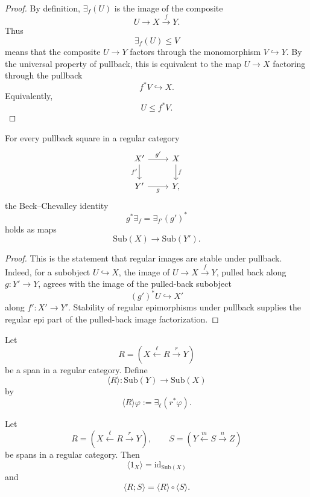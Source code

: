 \begin{proof}
By definition, \(\exists_f(U)\) is the image of the composite
\[
U\to X\xrightarrow{f}Y.
\]
Thus
\[
\exists_f(U)\le V
\]
means that the composite \(U\to Y\) factors through the monomorphism \(V\hookrightarrow Y\). By the universal property of pullback, this is equivalent to the map \(U\to X\) factoring through the pullback
\[
f^\ast V\hookrightarrow X.
\]
Equivalently,
\[
U\le f^\ast V.
\]
\end{proof}

\begin{proposition}
\label{prop:regular-beck-chevalley}
For every pullback square in a regular category
\[
\begin{tikzcd}
X' \arrow[r, "g'"] \arrow[d, "f'"']
&
X \arrow[d, "f"]
\\
Y' \arrow[r, "g"']
&
Y,
\end{tikzcd}
\]
the Beck--Chevalley identity
\[
g^\ast\exists_f
=
\exists_{f'}(g')^\ast
\]
holds as maps
\[
\mathrm{Sub}(X)\to\mathrm{Sub}(Y').
\]
\end{proposition}

\begin{proof}
This is the statement that regular images are stable under pullback. Indeed, for a subobject \(U\hookrightarrow X\), the image of \(U\to X\xrightarrow{f}Y\), pulled back along \(g:Y'\to Y\), agrees with the image of the pulled-back subobject
\[
(g')^\ast U\hookrightarrow X'
\]
along \(f':X'\to Y'\). Stability of regular epimorphisms under pullback supplies the regular epi part of the pulled-back image factorization.
\end{proof}

\begin{definition}
\label{def:span-diamond-regular}
Let
\[
R=
\left(
X\xleftarrow{\ell}R\xrightarrow{r}Y
\right)
\]
be a span in a regular category. Define
\[
\langle R\rangle:
\mathrm{Sub}(Y)\to\mathrm{Sub}(X)
\]
by
\[
\langle R\rangle\varphi
:=
\exists_{\ell}(r^\ast\varphi).
\]
\end{definition}

\begin{proposition}
\label{prop:span-diamond-functoriality}
Let
\[
R=
\left(
X\xleftarrow{\ell}R\xrightarrow{r}Y
\right),
\qquad
S=
\left(
Y\xleftarrow{m}S\xrightarrow{n}Z
\right)
\]
be spans in a regular category. Then
\[
\langle 1_X\rangle=\mathrm{id}_{\mathrm{Sub}(X)}
\]
and
\[
\langle R;S\rangle
=
\langle R\rangle\circ\langle S\rangle.
\]
\end{proposition}

